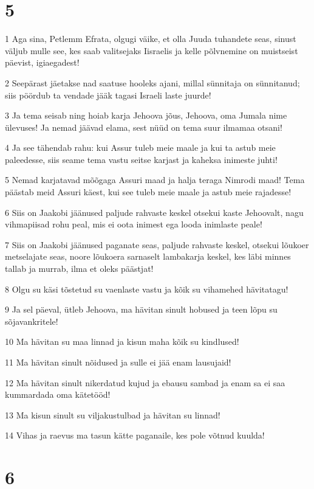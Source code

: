 \chapter{5}

\par 1 Aga sina, Petlemm Efrata, olgugi väike, et olla Juuda tuhandete seas, sinust väljub mulle see, kes saab valitsejaks Iisraelis ja kelle põlvnemine on muistseist päevist, igiaegadest!
\par 2 Seepärast jäetakse nad saatuse hooleks ajani, millal sünnitaja on sünnitanud; siis pöördub ta vendade jääk tagasi Israeli laste juurde!
\par 3 Ja tema seisab ning hoiab karja Jehoova jõus, Jehoova, oma Jumala nime ülevuses! Ja nemad jäävad elama, sest nüüd on tema suur ilmamaa otsani!
\par 4 Ja see tähendab rahu: kui Assur tuleb meie maale ja kui ta astub meie paleedesse, siis seame tema vastu seitse karjast ja kaheksa inimeste juhti!
\par 5 Nemad karjatavad mõõgaga Assuri maad ja halja teraga Nimrodi maad! Tema päästab meid Assuri käest, kui see tuleb meie maale ja astub meie rajadesse!
\par 6 Siis on Jaakobi jäänused paljude rahvaste keskel otsekui kaste Jehoovalt, nagu vihmapiisad rohu peal, mis ei oota inimest ega looda inimlaste peale!
\par 7 Siis on Jaakobi jäänused paganate seas, paljude rahvaste keskel, otsekui lõukoer metselajate seas, noore lõukoera sarnaselt lambakarja keskel, kes läbi minnes tallab ja murrab, ilma et oleks päästjat!
\par 8 Olgu su käsi tõstetud su vaenlaste vastu ja kõik su vihamehed hävitatagu!
\par 9 Ja sel päeval, ütleb Jehoova, ma hävitan sinult hobused ja teen lõpu su sõjavankritele!
\par 10 Ma hävitan su maa linnad ja kisun maha kõik su kindlused!
\par 11 Ma hävitan sinult nõidused ja sulle ei jää enam lausujaid!
\par 12 Ma hävitan sinult nikerdatud kujud ja ebausu sambad ja enam sa ei saa kummardada oma kätetööd!
\par 13 Ma kisun sinult su viljakustulbad ja hävitan su linnad!
\par 14 Vihas ja raevus ma tasun kätte paganaile, kes pole võtnud kuulda!

\chapter{6}

